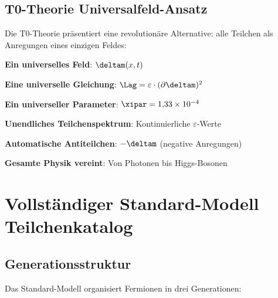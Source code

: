 	\subsection{T0-Theorie Universalfeld-Ansatz}
	
	Die T0-Theorie präsentiert eine revolutionäre Alternative: alle Teilchen als Anregungen eines einzigen Feldes:
	
	\begin{tcolorbox}[colback=blue!5!white,colframe=blue!75!black,title=T0 Universalfeld-Vereinfachung]
		\textbf{Ein universelles Feld}: $\deltam(x,t)$
		
		\textbf{Eine universelle Gleichung}: $\Lag = \varepsilon \cdot (\partial \deltam)^2$
		
		\textbf{Ein universeller Parameter}: $\xipar = 1{,}33 \times 10^{-4}$
		
		\textbf{Unendliches Teilchenspektrum}: Kontinuierliche $\varepsilon$-Werte
		
		\textbf{Automatische Antiteilchen}: $-\deltam$ (negative Anregungen)
		
		\textbf{Gesamte Physik vereint}: Von Photonen bis Higgs-Bosonen
	\end{tcolorbox}
	
	\section{Vollständiger Standard-Modell Teilchenkatalog}
	
	\subsection{Generationsstruktur}
	
	Das Standard-Modell organisiert Fermionen in drei Generationen:
	
	\begin{table}[htbp]
		\centering
		\caption{Standard-Modell Drei-Generationen-Struktur}
		\label{tab:sm_generations}
	\end{table}
	
